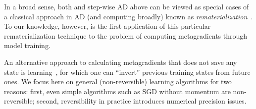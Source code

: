 \begin{remark}
In a broad sense, both \replay{} and step-wise AD above can be viewed as
special cases of a classical approach in AD (and computing broadly) known as
\textit{rematerialization}~\citep{chaitin1981register,briggs1992rematerialization,zweig2000exact,griewank2008evaluating,chen2016training}.
To our knowledge, however, \replay{} is the first application of this 
particular rematerialization technique to the problem of computing metagradients through 
model training.
\end{remark}

\begin{remark}
  An alternative approach to calculating metagradients that does not save any 
  state is \underline{} learning~\citep{maclaurin2015gradient},
  for which one can ``invert'' previous training states from future ones.
  We focus here on general (non-reversible) learning algorithms for two reasons: first, 
  even simple algorithms such as SGD without momentum are non-reversible; second, 
  reversibility in practice introduces numerical precision issues.
\end{remark}
